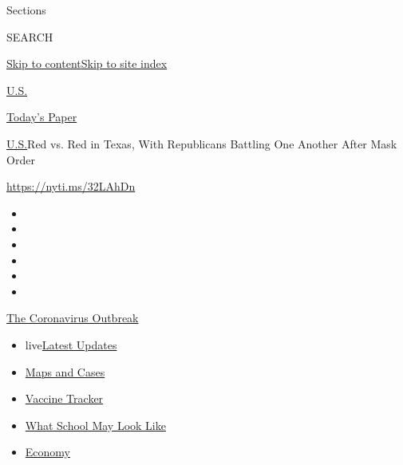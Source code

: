 Sections

SEARCH

\protect\hyperlink{site-content}{Skip to
content}\protect\hyperlink{site-index}{Skip to site index}

\href{https://www.nytimes.com/section/us}{U.S.}

\href{https://myaccount.nytimes.com/auth/login?response_type=cookie\&client_id=vi}{}

\href{https://www.nytimes.com/section/todayspaper}{Today's Paper}

\href{/section/us}{U.S.}\textbar{}Red vs. Red in Texas, With Republicans
Battling One Another After Mask Order

\url{https://nyti.ms/32LAhDn}

\begin{itemize}
\item
\item
\item
\item
\item
\item
\end{itemize}

\href{https://www.nytimes.com/news-event/coronavirus?action=click\&pgtype=Article\&state=default\&region=TOP_BANNER\&context=storylines_menu}{The
Coronavirus Outbreak}

\begin{itemize}
\tightlist
\item
  live\href{https://www.nytimes.com/2020/08/01/world/coronavirus-covid-19.html?action=click\&pgtype=Article\&state=default\&region=TOP_BANNER\&context=storylines_menu}{Latest
  Updates}
\item
  \href{https://www.nytimes.com/interactive/2020/us/coronavirus-us-cases.html?action=click\&pgtype=Article\&state=default\&region=TOP_BANNER\&context=storylines_menu}{Maps
  and Cases}
\item
  \href{https://www.nytimes.com/interactive/2020/science/coronavirus-vaccine-tracker.html?action=click\&pgtype=Article\&state=default\&region=TOP_BANNER\&context=storylines_menu}{Vaccine
  Tracker}
\item
  \href{https://www.nytimes.com/interactive/2020/07/29/us/schools-reopening-coronavirus.html?action=click\&pgtype=Article\&state=default\&region=TOP_BANNER\&context=storylines_menu}{What
  School May Look Like}
\item
  \href{https://www.nytimes.com/live/2020/07/31/business/stock-market-today-coronavirus?action=click\&pgtype=Article\&state=default\&region=TOP_BANNER\&context=storylines_menu}{Economy}
\end{itemize}

